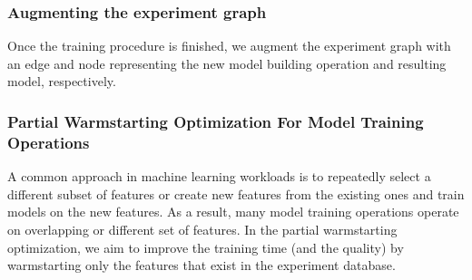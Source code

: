 \subsubsection{Augmenting the experiment graph}
Once the training procedure is finished, we augment the experiment graph with an edge and node representing the new model building operation and resulting model, respectively.

\subsubsection{Partial Warmstarting Optimization For Model Training Operations}
A common approach in machine learning workloads is to repeatedly select a different subset of features or create new features from the existing ones and train models on the new features.
As a result, many model training operations operate on overlapping or different set of features.
In the partial warmstarting optimization, we aim to improve the training time (and the quality) by warmstarting only the features that exist in the experiment database.

